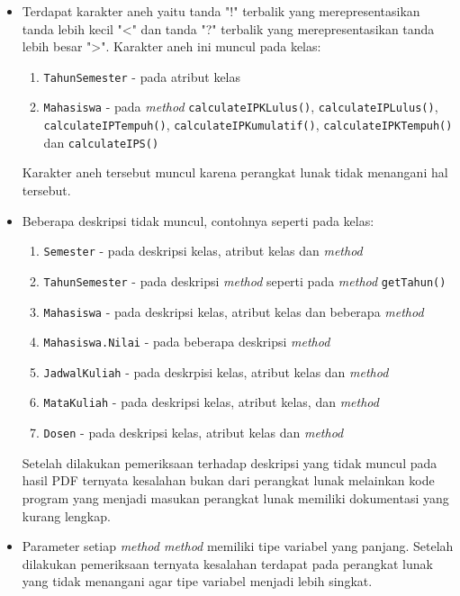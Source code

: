 \begin{itemize}
	\item Terdapat karakter aneh yaitu tanda "!" terbalik yang merepresentasikan tanda lebih kecil "<" dan tanda "?" terbalik yang merepresentasikan tanda lebih besar ">". Karakter aneh ini muncul pada kelas: 
	\begin{enumerate}
		\item {\tt TahunSemester} - pada atribut kelas
		\item {\tt Mahasiswa} - pada {\it method} {\tt calculateIPKLulus()}, {\tt calculateIPLulus()}, {\tt calculateIPTempuh()}, {\tt calculateIPKumulatif()}, {\tt calculateIPKTempuh()} dan {\tt calculateIPS()}
	\end{enumerate}
	Karakter aneh tersebut muncul karena perangkat lunak tidak menangani hal tersebut.
	\item Beberapa deskripsi tidak muncul, contohnya seperti pada kelas:
	\begin{enumerate}
		\item {\tt Semester} - pada deskripsi kelas, atribut kelas dan {\it method}
		\item {\tt TahunSemester} - pada deskripsi {\it method} seperti pada {\it method} {\tt  getTahun()}
		\item {\tt Mahasiswa} - pada deskripsi kelas, atribut kelas dan beberapa {\it method}
		\item {\tt Mahasiswa.Nilai} - pada beberapa deskripsi {\it method}
		\item {\tt JadwalKuliah} - pada deskrpisi kelas, atribut kelas dan {\it method}
		\item {\tt MataKuliah} - pada deskripsi kelas, atribut kelas, dan {\it method}
		\item {\tt Dosen} - pada deskripsi kelas, atribut kelas dan {\it method}
	\end{enumerate}
	Setelah dilakukan pemeriksaan terhadap deskripsi yang tidak muncul pada hasil PDF ternyata kesalahan bukan dari perangkat lunak melainkan kode program yang menjadi masukan perangkat lunak memiliki dokumentasi yang kurang lengkap.
	\item Parameter setiap {\it method method} memiliki tipe variabel yang panjang. Setelah dilakukan pemeriksaan ternyata kesalahan terdapat pada perangkat lunak yang tidak menangani agar tipe variabel menjadi lebih singkat.
\end{itemize}























